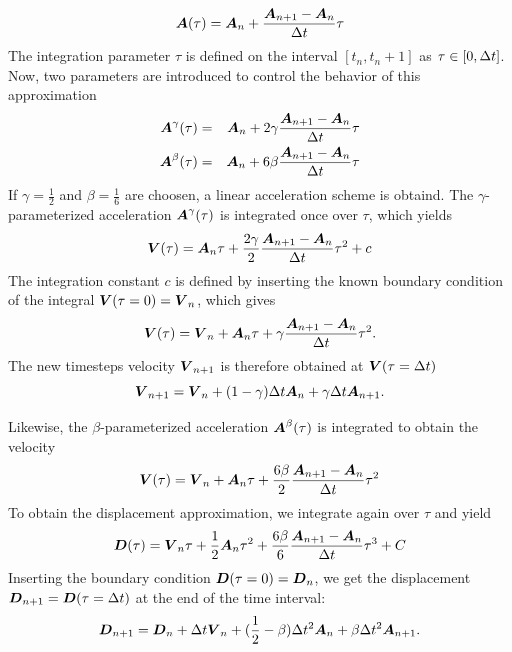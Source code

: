 \begin{equation*}
  \boldsymbol{A}(\tau) = \boldsymbol{A}_n + \frac{\boldsymbol{A}_{n+1} - \boldsymbol{A}_n}{\Delta t}\tau
\end{equation*}
The integration parameter $\tau$ is defined on the interval $[t_n,t_n+1]$ as $\tau \in[0,\Delta t]$.
Now, two parameters are introduced to control the behavior of this approximation
\begin{eqnarray*}
  \boldsymbol{A}^\gamma(\tau) &=& \boldsymbol{A}_n + 2\gamma \frac{\boldsymbol{A}_{n+1} - \boldsymbol{A}_n}{\Delta t}\tau\\
  \boldsymbol{A}^\beta(\tau) &=& \boldsymbol{A}_n + 6\beta  \frac{\boldsymbol{A}_{n+1} - \boldsymbol{A}_n}{\Delta t}\tau
\end{eqnarray*}
If \(\gamma=\frac{1}{2}\) and \(\beta=\frac{1}{6}\) are choosen, a linear acceleration scheme is obtaind.
The $\gamma$-parameterized acceleration $\boldsymbol{A}^\gamma(\tau)$ is integrated once over $\tau$, which yields
\begin{equation*}
  \boldsymbol{V}(\tau) = \boldsymbol{A}_n \tau + \frac{2\gamma}{2}\frac{\boldsymbol{A}_{n+1} - \boldsymbol{A}_n}{\Delta t}\tau^2 + c
\end{equation*}
The integration constant $c$ is defined by inserting the known boundary condition of the integral $\boldsymbol{V}(\tau=0) = \boldsymbol{V}_n$, which gives
\begin{equation*}
  \boldsymbol{V}(\tau) = \boldsymbol{V}_n + \boldsymbol{A}_n \tau + \gamma\frac{\boldsymbol{A}_{n+1} - \boldsymbol{A}_n}{\Delta t}\tau^2\text{.}
\end{equation*}
The new timesteps velocity $\boldsymbol{V}_{n+1}$ is therefore obtained at $\boldsymbol{V}(\tau = \Delta t)$
\begin{equation*}
  \boldsymbol{V}_{n+1} = \boldsymbol{V}_n + (1-\gamma)\Delta t\boldsymbol{A}_n  + \gamma\Delta t\boldsymbol{A}_{n+1}\text{.}
\end{equation*}

Likewise, the $\beta$-parameterized acceleration $\boldsymbol{A}^\beta(\tau)$ is integrated to obtain the velocity
\begin{equation*}
  \boldsymbol{V}(\tau) = \boldsymbol{V}_n + \boldsymbol{A}_n \tau + \frac{6\beta}{2}\frac{\boldsymbol{A}_{n+1} - \boldsymbol{A}_n}{\Delta t}\tau^2
\end{equation*}
To obtain the displacement approximation, we integrate again over $\tau$ and yield
\begin{equation*}
  \boldsymbol{D}(\tau) = \boldsymbol{V}_n \tau + \frac{1}{2}\boldsymbol{A}_n \tau^2 + \frac{6\beta}{6}\frac{\boldsymbol{A}_{n+1} - \boldsymbol{A}_n}{\Delta t}\tau^3 + C
\end{equation*}
Inserting the boundary condition $\boldsymbol{D}(\tau=0) = \boldsymbol{D}_n$, we get the displacement $\boldsymbol{D}_{n+1} = \boldsymbol{D}(\tau = \Delta t)$ at the end of the time interval:
\begin{equation*}
  \boldsymbol{D}_{n+1} = \boldsymbol{D}_n + \Delta t \boldsymbol{V}_n  + (\frac{1}{2}-\beta)\Delta t^2\boldsymbol{A}_n + \beta\Delta t^2\boldsymbol{A}_{n+1}\text{.}
\end{equation*}

